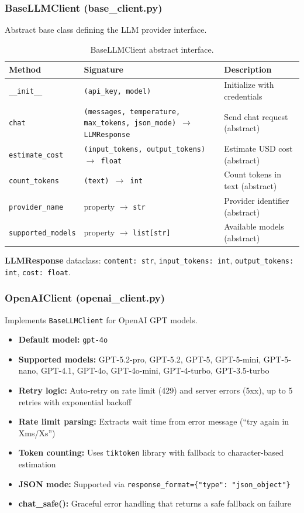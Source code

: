 \documentclass[11pt,a4paper]{article}
\begin{document}
\subsubsection{BaseLLMClient (base\_client.py)}

Abstract base class defining the LLM provider interface.

\begin{table}[H]
\centering
\begin{tabular}{p{4cm}p{4cm}p{5cm}}
\toprule
\textbf{Method} & \textbf{Signature} & \textbf{Description} \\
\midrule
\texttt{\_\_init\_\_} & \texttt{(api\_key, model)} & Initialize with credentials \\
\texttt{chat} & \texttt{(messages, temperature, max\_tokens, json\_mode) $\to$ LLMResponse} & Send chat request (abstract) \\
\texttt{estimate\_cost} & \texttt{(input\_tokens, output\_tokens) $\to$ float} & Estimate USD cost (abstract) \\
\texttt{count\_tokens} & \texttt{(text) $\to$ int} & Count tokens in text (abstract) \\
\texttt{provider\_name} & property $\to$ \texttt{str} & Provider identifier (abstract) \\
\texttt{supported\_models} & property $\to$ \texttt{list[str]} & Available models (abstract) \\
\bottomrule
\end{tabular}
\caption{BaseLLMClient abstract interface.}
\end{table}

\textbf{LLMResponse} dataclass: \texttt{content: str}, \texttt{input\_tokens: int}, \texttt{output\_tokens: int}, \texttt{cost: float}.

\subsubsection{OpenAIClient (openai\_client.py)}

Implements \texttt{BaseLLMClient} for OpenAI GPT models.

\begin{itemize}[nosep]
  \item \textbf{Default model:} \texttt{gpt-4o}
  \item \textbf{Supported models:} GPT-5.2-pro, GPT-5.2, GPT-5, GPT-5-mini, GPT-5-nano, GPT-4.1, GPT-4o, GPT-4o-mini, GPT-4-turbo, GPT-3.5-turbo
  \item \textbf{Retry logic:} Auto-retry on rate limit (429) and server errors (5xx), up to 5 retries with exponential backoff
  \item \textbf{Rate limit parsing:} Extracts wait time from error message (``try again in Xms/Xs'')
  \item \textbf{Token counting:} Uses \texttt{tiktoken} library with fallback to character-based estimation
  \item \textbf{JSON mode:} Supported via \texttt{response\_format=\{"type": "json\_object"\}}
  \item \textbf{chat\_safe():} Graceful error handling that returns a safe fallback on failure
\end{itemize}
\end{document}
